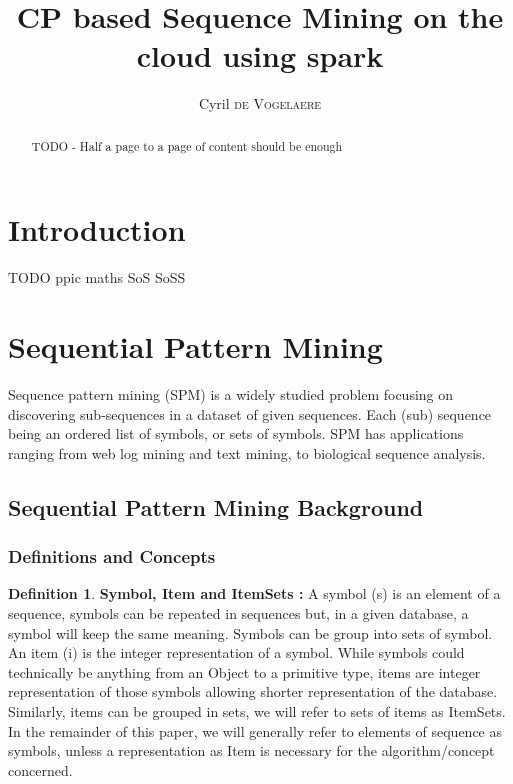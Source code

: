 \documentclass{eplmastersthesis}
\title{CP based Sequence Mining on the cloud using spark}	%
\author{Cyril \textsc{de Vogelaere}}	%
\begin{document}
\begin{singlespacing}
\maketitle					%
\end{singlespacing}

\tableofcontents
\newpage
\listoffigures
\listoftables
\listofalgorithms
\newpage

\begin{abstract}
TODO - Half a page to a page of content should be enough
\end{abstract}
\newpage


\section{Introduction}

TODO \acrlong{ppic} \gls{maths} \acrlong{SoS} \acrlong{SoSS}

\section{Sequential Pattern Mining}

Sequence pattern mining (SPM) is a widely studied problem focusing on discovering sub-sequences in a dataset of given sequences. Each (sub) sequence being an ordered list of symbols, or sets of symbols. SPM has applications ranging from web log mining and text mining, to biological sequence analysis.

\subsection{Sequential Pattern Mining Background}

\subsubsection{Definitions and Concepts}

\theoremstyle{definition}
\newtheorem{definition}{Definition}[]

\theoremstyle{example}
\newtheorem{example}{Example}[]

\begin{definition}{\bfseries Symbol, Item and ItemSets :}
A symbol (s) is an element of a sequence, symbols can be repeated in sequences but, in a given database, a symbol will keep the same meaning. Symbols can be group into sets of symbol. \\
An item (i) is the integer representation of a symbol. While symbols could technically be anything from an Object to a primitive type, items are integer representation of those symbols allowing shorter representation of the database. Similarly, items can be grouped in sets, we will refer to sets of items as ItemSets. \\
In the remainder of this paper, we will generally refer to elements of sequence as symbols, unless a representation as Item is necessary for the algorithm/concept concerned.
\end{definition}
\end{document}
